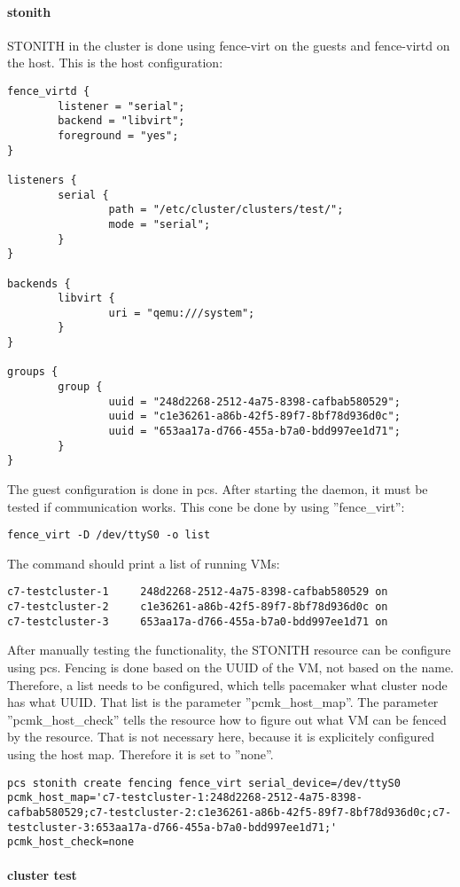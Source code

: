\paragraph{stonith}
\ac{STONITH} in the cluster is done using fence-virt on the guests and fence-virtd on
the host.
This is the host configuration:
\begin{lstlisting}
fence_virtd {
        listener = "serial";
        backend = "libvirt";
        foreground = "yes";
}

listeners {
        serial {
                path = "/etc/cluster/clusters/test/";
                mode = "serial";
        }
}

backends {
        libvirt { 
                uri = "qemu:///system";
        }
}

groups {
        group {
                uuid = "248d2268-2512-4a75-8398-cafbab580529";
                uuid = "c1e36261-a86b-42f5-89f7-8bf78d936d0c";
                uuid = "653aa17a-d766-455a-b7a0-bdd997ee1d71";
        }
}

\end{lstlisting}
The guest configuration is done in pcs. After starting the daemon, it must be tested
if communication works. This cone be done by using ''fence\_virt'':
\begin{lstlisting}
fence_virt -D /dev/ttyS0 -o list
\end{lstlisting}
The command should print a list of running \acp{VM}:
\begin{lstlisting}
c7-testcluster-1     248d2268-2512-4a75-8398-cafbab580529 on
c7-testcluster-2     c1e36261-a86b-42f5-89f7-8bf78d936d0c on
c7-testcluster-3     653aa17a-d766-455a-b7a0-bdd997ee1d71 on
\end{lstlisting}
After manually testing the functionality, the \ac{STONITH} resource can be configure
using pcs. Fencing is done based on the \ac{UUID} of the \ac{VM}, not based on the name.
Therefore, a list needs to be configured, which tells pacemaker what cluster node has what 
\ac{UUID}. That list is the parameter ''pcmk\_host\_map''. The parameter ''pcmk\_host\_check'' tells
the resource how to figure out what \acs{VM} can be fenced by the resource. That is not necessary here,
because it is explicitely configured using the host map. Therefore it is set to ''none''.
\begin{lstlisting}
pcs stonith create fencing fence_virt serial_device=/dev/ttyS0 pcmk_host_map='c7-testcluster-1:248d2268-2512-4a75-8398-cafbab580529;c7-testcluster-2:c1e36261-a86b-42f5-89f7-8bf78d936d0c;c7-testcluster-3:653aa17a-d766-455a-b7a0-bdd997ee1d71;' pcmk_host_check=none
\end{lstlisting}
\paragraph{cluster test}


